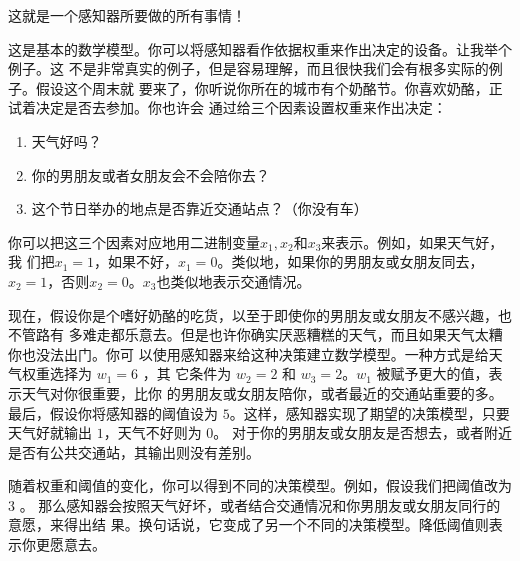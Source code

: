 这就是一个感知器所要做的所有事情！

这是基本的数学模型。你可以将感知器看作依据权重来作出决定的设备。让我举个例子。这
不是非常真实的例子，但是容易理解，而且很快我们会有根多实际的例子。假设这个周末就
要来了，你听说你所在的城市有个奶酪节。你喜欢奶酪，正试着决定是否去参加。你也许会
通过给三个因素设置权重来作出决定：
\begin{enumerate}
\item 天气好吗？
\item 你的男朋友或者女朋友会不会陪你去？
\item 这个节日举办的地点是否靠近交通站点？（你没有车）
\end{enumerate}

你可以把这三个因素对应地用二进制变量$x_1,x_2$和$x_3$来表示。例如，如果天气好，我
们把$x_1 = 1$，如果不好，$x_1 = 0$。类似地，如果你的男朋友或女朋友同去，$x_2 =
1$，否则$x_2 = 0$。$x_3$也类似地表示交通情况。

现在，假设你是个嗜好奶酪的吃货，以至于即使你的男朋友或女朋友不感兴趣，也不管路有
多难走都乐意去。但是也许你确实厌恶糟糕的天气，而且如果天气太糟你也没法出门。你可
以使用感知器来给这种决策建立数学模型。一种方式是给天气权重选择为 $w_1 = 6$ ，其
它条件为 $w_2 = 2$ 和 $w_3 = 2$。$w_1$ 被赋予更大的值，表示天气对你很重要，比你
的男朋友或女朋友陪你，或者最近的交通站重要的多。最后，假设你将感知器的阈值设为
$5$。这样，感知器实现了期望的决策模型，只要天气好就输出 $1$，天气不好则为 $0$。
对于你的男朋友或女朋友是否想去，或者附近是否有公共交通站，其输出则没有差别。

随着权重和阈值的变化，你可以得到不同的决策模型。例如，假设我们把阈值改为 $3$ 。
那么感知器会按照天气好坏，或者结合交通情况和你男朋友或女朋友同行的意愿，来得出结
果。换句话说，它变成了另一个不同的决策模型。降低阈值则表示你更愿意去。

